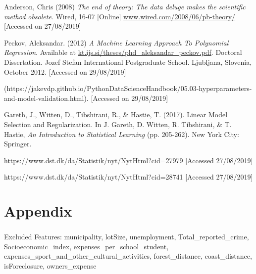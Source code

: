 \documentclass[12pt,a4paper]{article}
\begin{document}
Anderson, Chris (2008) \textit{The end of theory: The data deluge makes the scientific method obsolete}. Wired, 16-07 [Online] \href{https://www.wired.com/2008/06/pb-theory/}{www.wired.com/2008/06/pb-theory/} [Accessed on 27/08/2019]\newline

Peckov, Aleksandar. (2012)  \textit{A Machine Learning Approach To Polynomial Regression}. Available at \href{http://kt.ijs.si/theses/phd_aleksandar_peckov.pdf}{kt.ijs.si/theses/phd\_aleksandar\_peckov.pdf}. Doctoral Dissertation. Jozef Stefan International Postgraduate School. Ljubljana, Slovenia, October 2012. [Accessed on 29/08/2019]

(https://jakevdp.github.io/PythonDataScienceHandbook/05.03-hyperparameters-and-model-validation.html). [Accessed on 29/08/2019]\newline

Gareth, J., Witten, D., Tibshirani, R., \& Hastie, T. (2017). Linear Model Selection and Regularization. In J. Gareth, D. Witten, R. Tibshirani, \& T. Hastie, \textit{An Introduction to Statistical Learning} (pp. 205-262). New York City: Springer.





https://www.dst.dk/da/Statistik/nyt/NytHtml?cid=27979 [Accessed 27/08/2019]\newline

https://www.dst.dk/da/Statistik/nyt/NytHtml?cid=28741 [Accessed 27/08/2019]\newline
\newpage
\section{Appendix}
\subsubsection{}
Excluded Features:\newline
municipality, lotSize, unemployment, Total\_reported\_crime, Socioeconomic\_index, expenses\_per\_school\_student, expenses\_sport\_and\_other\_cultural\_activities, forest\_distance, coast\_distance, isForeclosure, owners\_expense
\end{document}
